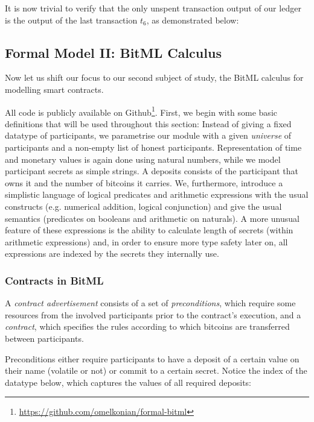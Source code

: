 \documentclass[acmsmall,nonacm=true,screen=true]{acmart}
\newcommand\site[1]{\footnote{\url{#1}}}
\begin{document}
It is now trivial to verify that the only unspent transaction output of our ledger is the output of the last
transaction $t_6$, as demonstrated below:
\UTXOexampleC{}

\subsection{Formal Model II: BitML Calculus} \label{subsec:bitml}
Now let us shift our focus to our second subject of study, the BitML calculus for modelling smart contracts.

All code is publicly available on Github\site{https://github.com/omelkonian/formal-bitml}.
First, we begin with some basic definitions that will be used throughout this section:
\BITbasicTypes{}
Instead of giving a fixed datatype of participants, we parametrise our module with a given \textit{universe} of participants
and a non-empty list of honest participants.
Representation of time and monetary values is again done using natural numbers, while we model participant secrets as simple strings.
A deposits consists of the participant that owns it and the number of bitcoins it carries.
We, furthermore, introduce a simplistic language of logical predicates and arithmetic expressions with the usual constructs (e.g. numerical addition, logical conjunction) and give the usual semantics (predicates on booleans and arithmetic on naturals).
A more unusual feature of these expressions is the ability to calculate length of secrets (within arithmetic expressions)
and, in order to ensure more type safety later on, all expressions are indexed by the secrets they internally use.

\subsubsection{Contracts in BitML}
A \textit{contract advertisement} consists of a set of \textit{preconditions},
which require some resources from the involved participants prior to the contract's execution,
and a \textit{contract}, which specifies the rules according to which bitcoins are transferred between participants.

Preconditions either require participants to have a deposit of a certain value on their name (volatile or not) or 
commit to a certain secret. Notice the index of the datatype below, which captures the values of all required deposits:
\BITpreconditions{}
\end{document}
